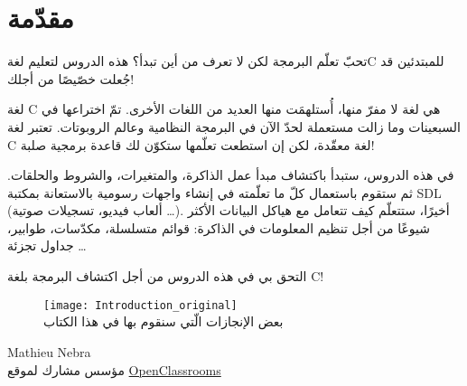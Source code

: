 \chapter*{مقدّمة}

\vspace{-0.6em}
تحبّ تعلّم البرمجة لكن لا تعرف من أين تبدأ؟ هذه الدروس لتعليم لغة\textenglish{C}
للمبتدئين قد جُعلت خصّيصًا من أجلك!

\vspace{-0.1em}
لغة \textenglish{C}
هي لغة لا مفرّ منها، أُستلهمَت منها العديد من اللغات الأخرى. تمّ اختراعها في السبعينات وما زالت مستعملة لحدّ الآن في البرمجة النظامية وعالم الروبوتات. تعتبر لغة \textenglish{C}
لغة معقّدة، لكن إن استطعت تعلّمها ستكوّن لك قاعدة برمجية صلبة!

\vspace{-0.1em}
في هذه الدروس، ستبدأ باكتشاف مبدأ عمل الذاكرة، والمتغيرات، والشروط والحلقات. ثم ستقوم باستعمال كلّ ما تعلّمته في إنشاء واجهات رسومية بالاستعانة بمكتبة
\textenglish{SDL}
 (ألعاب فيديو، تسجيلات صوتية \dots). أخيرًا، ستتعلّم كيف تتعامل مع هياكل البيانات الأكثر شيوعًا من أجل تنظيم المعلومات في الذاكرة: قوائم متسلسلة، مكدّسات، طوابير، جداول تجزئة \dots

\vspace{-0.1em}
التحق بي في هذه الدروس من أجل اكتشاف البرمجة بلغة \textenglish{C}!

\begin{figure}[H]
	\centering
	\texttt{[image: Introduction\_original]}\\
\small بعض الإنجازات الّتي سنقوم بها في هذا الكتاب
\end{figure}

\vfill
\hfill\parbox{0.3\textwidth}{\centering \textenglish{Mathieu Nebra}\\[0.2em]
مؤسس مشارك لموقع
\href{http://openclassrooms.com/}{\textenglish{OpenClassrooms}}
}
